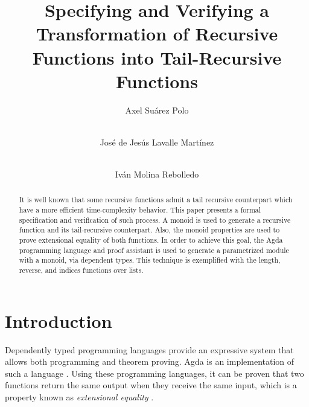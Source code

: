 \documentclass[runningheads]{llncs}
\begin{document}
\title{Specifying and Verifying a Transformation of Recursive Functions into
       Tail-Recursive Functions}

\author{ Axel Suárez Polo \and \\
         José de Jesús Lavalle Martínez \and \\
         Iván Molina Rebolledo
    }



\maketitle

\begin{abstract}

It is well known that some recursive functions admit a tail recursive counterpart which
have a more efficient time-complexity behavior. This paper presents a formal
specification and verification of such process. A monoid is used to generate a recursive
function and its tail-recursive counterpart. Also, the monoid properties are used to
prove extensional equality of both functions. In order to achieve this goal, the Agda
programming language and proof assistant is used to generate a parametrized module with a
monoid, via dependent types. This technique is exemplified with the length, reverse, and
indices functions over lists.

\end{abstract}

\section{Introduction}

Dependently typed programming languages provide an expressive system that allows both
programming and theorem proving. Agda is an implementation of such a language
\cite{bove2009brief}. Using these programming languages, it can be proven that two
functions return the same output when they receive the same input, which is a property
known as \emph{extensional equality} \cite{botta2021extensional}.
\end{document}

